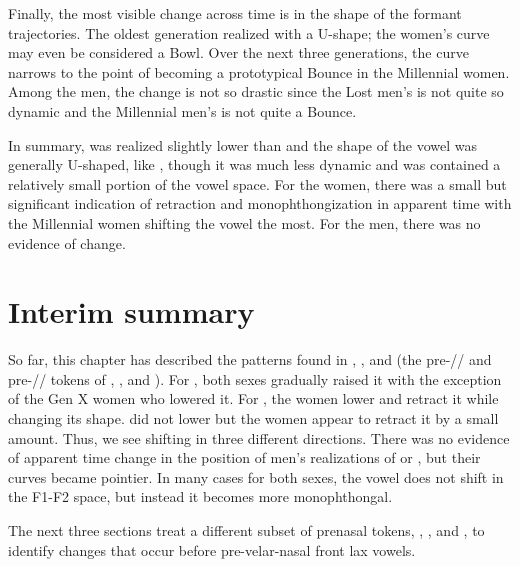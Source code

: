 Finally, the most visible change across time is in the shape of the formant trajectories. The oldest generation realized \bin with a U-shape; the women's curve may even be considered a Bowl. Over the next three generations, the curve narrows to the point of becoming a prototypical Bounce in the Millennial women. Among the men, the change is not so drastic since the Lost men's \bin is not quite so dynamic and the Millennial men's \bin is not quite a Bounce.

In summary, \bin was realized slightly lower than \bit and the shape of the vowel was generally U-shaped, like \ban, though it was much less dynamic and was contained a relatively small portion of the vowel space. For the women, there was a small but significant indication of retraction and monophthongization in apparent time with the Millennial women shifting the vowel the most. For the men, there was no evidence of change.

\section{Interim summary}

So far, this chapter has described the patterns found in \ban, \ben, and \bin (the pre-// and pre-// tokens of \trap, \dress, and \kit). For \ban, both sexes gradually raised it with the exception of the Gen X women who lowered it. For \ben, the women lower and retract it while changing its shape. \bin did not lower but the women appear to retract it by a small amount. Thus, we see shifting in three different directions. There was no evidence of apparent time change in the position of men's realizations of \ben or \bin, but their curves became pointier. In many cases for both sexes, the vowel does not shift in the F1-F2 space, but instead it becomes more monophthongal.

The next three sections treat a different subset of prenasal tokens, \bang, \beng, and \bing, to identify changes that occur before pre-velar-nasal front lax vowels.








\section{\bang}
\label{BANG}

